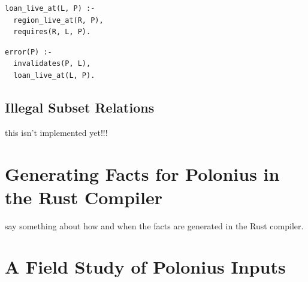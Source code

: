 \documentclass[11pt,a4paper,twoside,openany]{report}
\newcommand{\fixme}[1] {{\color{red}#1}}
\newenvironment{sourcecode}{\captionsetup{type=listing}}{}
\begin{document}
\begin{sourcecode}
  \label{lst:loan-live}
\begin{verbatim}
loan_live_at(L, P) :-
  region_live_at(R, P),
  requires(R, L, P).
\end{verbatim}
\end{sourcecode}

\begin{sourcecode}
  \label{lst:error-invalidates}
\begin{verbatim}
error(P) :-
  invalidates(P, L),
  loan_live_at(L, P).
\end{verbatim}
\end{sourcecode}

\subsection{Illegal Subset Relations}\label{sec:illeg-subs-relat}

\fixme{this isn't implemented yet!!!}

\section{Generating Facts for Polonius in the Rust Compiler}

\fixme{say something about how and when the facts are generated in the Rust
  compiler.}

\section{A Field Study of Polonius Inputs}\label{sec:field-study-borrow}
\end{document}
